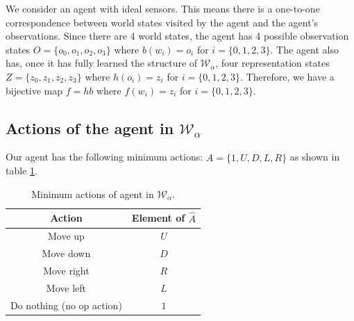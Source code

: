 We consider an agent with ideal sensors.
This means there is a one-to-one correspondence between world states visited by the agent and the agent's observations.
Since there are 4 world states, the agent has 4 possible observation states $O = \{ o_{0}, o_{1}, o_{2}, o_{3} \}$ where $b(w_{i}) = o_{i}$ for $i = \{0, 1, 2, 3 \}$.
The agent also has, once it has fully learned the structure of $\mathscr{W}_{\alpha}$, four representation states $Z = \{ z_{0}, z_{1}, z_{2}, z_{3} \}$ where $h(o_{i}) = z_{i}$ for $i = \{0, 1, 2, 3 \}$.
Therefore, we have a bijective map $f = hb$ where $f(w_{i}) = z_{i}$ for $i = \{0, 1, 2, 3 \}$.


\subsection{
	Actions of the agent in $\mathscr{W}_{\alpha}$
}\label{sec:Actions of the agent in example}

Our agent has the following minimum actions: $\hat{A} = \{ 1, U, D, L, R \}$ as shown in table \ref{tab:actions_of_agent_2_by_2_cyclical}.
\begin{table}[H]
	\centering
	\begin{tabular}{|c|c|}
		\hline
		Action                    & Element of $\hat{A}$ \\
		\hline
		Move up                   & $U$                  \\
		\hline
		Move down                 & $D$                  \\
		\hline
		Move right                & $R$                  \\
		\hline
		Move left                 & $L$                  \\
		\hline
		Do nothing (no op action) & $1$                  \\
		\hline
	\end{tabular}
	\caption{Minimum actions of agent in $\mathscr{W}_{\alpha}$.}
	\label{tab:actions_of_agent_2_by_2_cyclical}
\end{table}

